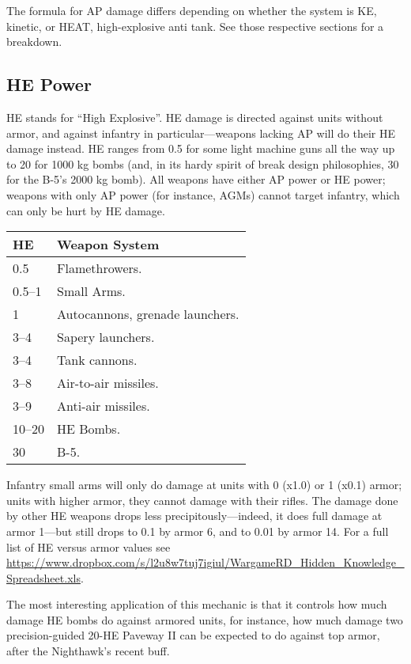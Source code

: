 \documentclass{article}
\begin{document}
The formula for AP damage differs depending on whether the system is KE,
kinetic, or HEAT, high-explosive anti tank. See those respective sections for a
breakdown.

\subsection{HE Power}

HE stands for ``High Explosive''. HE damage is directed against units without
armor, and against infantry in particular---weapons lacking AP will do their HE
damage instead. HE ranges from 0.5 for some light machine guns all the way up to
20 for 1000 kg bombs (and, in its hardy spirit of break design philosophies, 30
for the B-5's 2000 kg bomb). All weapons have either AP power or HE power;
weapons with only AP power (for instance, AGMs) cannot target infantry, which
can only be hurt by HE damage.

\begin{center}
    \begin{tabular}{ | l | l | }
    \hline
    HE & Weapon System \\ \hline
    0.5 & Flamethrowers. \\
    0.5--1 & Small Arms. \\
    1 & Autocannons, grenade launchers.\\
    3--4 & Sapery launchers. \\
    3--4 & Tank cannons.\\
    3--8 & Air-to-air missiles. \\
    3--9 & Anti-air missiles. \\
    10--20 & HE Bombs. \\
    30 & B-5. \\
    \hline
    \end{tabular}
\end{center}

Infantry small arms will only do damage at units with 0 (x1.0) or 1 (x0.1)
armor; units with higher armor, they cannot damage with their rifles. The damage
done by other HE weapons drops less precipitously---indeed, it does full damage
at armor 1---but still drops to 0.1 by armor 6, and to 0.01 by armor 14. For a
full list of HE versus armor values see
\url{https://www.dropbox.com/s/l2u8w7tuj7igiul/WargameRD_Hidden_Knowledge_Spreadsheet.xls}.

The most interesting application of this mechanic is that it controls how much
damage HE bombs do against armored units, for instance, how much damage two
precision-guided 20-HE Paveway II can be expected to do against top armor,
after the Nighthawk's recent buff.
\end{document}
